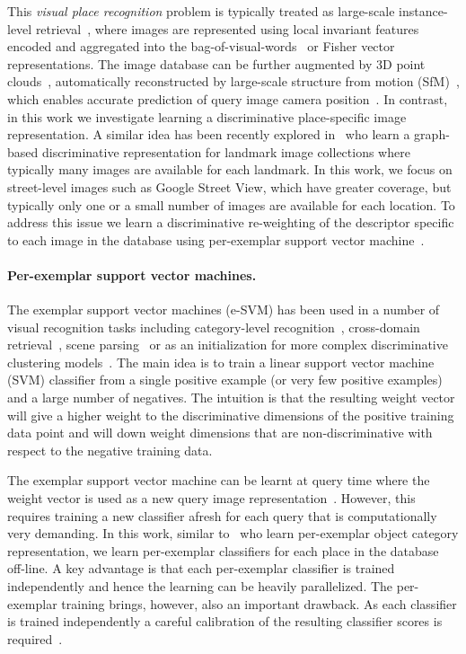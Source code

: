   This {\em visual place recognition} problem is typically treated as large-scale instance-level retrieval~\cite{Cummins09,Chen11,Knopp2010,Schindler07,Torii2013,Zamir10}, where images are represented using local invariant features~\cite{Lowe04} encoded and aggregated into the bag-of-visual-words~\cite{Csurka04,Sivic03} or Fisher vector~\cite{Jegou12} representations. The image database can be further augmented by 3D point clouds~\cite{Klinger13}, automatically reconstructed by large-scale structure from motion (SfM)~\cite{Agarwal-ICCV-2009,Klinger13}, which enables accurate prediction of query image camera position~\cite{Li12,Sattler12}.
  In contrast, in this work we investigate learning a discriminative place-specific image representation. A similar idea has been recently explored in~\cite{Cao13} who learn a graph-based discriminative representation for landmark image collections where typically many images are available for each landmark.
  In this work, we focus on street-level images such as Google Street View, which have greater coverage, but typically only one or a small number of images are  available for each 
  \textcolor{petr}{location}.  
  To address this issue we learn a discriminative re-weighting of the descriptor specific to each image in the database using per-exemplar support vector machine~\cite{Malisiewicz11}.
    

  \paragraph{Per-exemplar support vector machines.} 
    The exemplar support vector machines (e-SVM) has been used in a number of visual recognition tasks including category-level recognition~\cite{Malisiewicz11}, cross-domain retrieval~\cite{Shrivastava11}, scene parsing~\cite{Tighe13} or as an initialization  for more complex discriminative clustering models~\cite{Doersch12,Singh12}. The main idea is to train a linear support vector machine (SVM) classifier from a single positive example
    \textcolor{petr}{(or very few positive examples)}
     and a large number of negatives. The intuition is that the resulting weight vector will give a higher weight to the discriminative dimensions of the positive training data point and will down weight dimensions that are non-discriminative with respect to the negative training data. 
    

    The exemplar support vector machine can be learnt at query time where the weight vector is used as a new query image representation~\cite{Shrivastava11}. However, this requires training a new classifier afresh for each query that is computationally very demanding. In this work, similar to~\cite{Malisiewicz11} who learn per-exemplar object category representation, we learn per-exemplar classifiers for each place in the database off-line.  A key advantage is that each per-exemplar classifier is trained independently and hence the learning can be heavily parallelized. The per-exemplar training brings, however, also an important drawback. As each classifier is trained independently a careful calibration of the resulting classifier scores is required~\cite{Malisiewicz11}.

